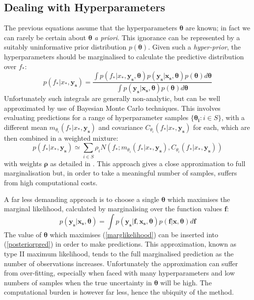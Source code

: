 \documentclass{article}
\DeclareMathOperator*{\argmax}{\arg\!\max\!}
\begin{document}
\subsection{Dealing with Hyperparameters}
The previous equations assume that the hyperparameters $\bm{\theta}$ are known; in fact we can rarely be certain about $\bm{\theta}$ \emph{a priori}. This ignorance can be represented by a suitably uninformative prior distribution $p(\bm{\theta})$. Given such a \emph{hyper-prior}, the hyperparameters should be marginalised to calculate the predictive distribution over $f_*$:
\begin{equation}\label{fullmargint}
p(f_* |x_*, \mathbf{y_s}) = \frac{\int p(f_* | x_*, \mathbf{y_s},\bm{\theta})p(\mathbf{y_s}|\mathbf{x_s},\bm{\theta})p(\bm{\theta})d\bm{\theta}}{\int p(\mathbf{y_s}|\mathbf{x_s},\bm{\theta})p(\bm{\theta})d\bm{\theta}}
\end{equation}
Unfortunately such integrals are generally non-analytic, but can be well approximated by use of Bayesian Monte Carlo \cite{bayesquad} techniques. This involves evaluating predictions for a range of hyperparameter samples $\{\bm{\theta_i}:i \in S\}$, with a different mean $m_{\theta_i}(f_* | x_*, \mathbf{y_s})$ and covariance $C_{\theta_i}(f_* | x_*, \mathbf{y_s})$ for each, which are then combined in a weighted mixture:
\begin{equation}
p(f_* |x_*, \mathbf{y_s}) \simeq \sum_{i \in S} \rho_i N(f_* ; m_{\theta_i}(f_* | x_*, \mathbf{y_s}),C_{\theta_i}(f_* | x_*, \mathbf{y_s}))
\end{equation}
with weights $\bm{\rho}$ as detailed in \cite{osborne2008towards}. This approach gives a close approximation to full marginalisation but, in order to take a meaningful number of samples, suffers from high computational costs.

A far less demanding approach is to choose a single $\bm{\theta}$ which maximises the marginal likelihood, calculated by marginalising over the function values $\mathbf{f}$:
\begin{equation}\label{marglikelihood}
p(\mathbf{y_s} | \mathbf{x_s}, \bm{\theta}) = \int p(\mathbf{y_s} | \mathbf{f},\mathbf{x_s}, \bm{\theta})p(\mathbf{f} | \mathbf{x},\bm{\theta}) d\mathbf{f}
\end{equation}
The value of $\bm{\theta}$ which maximises (\ref{marglikelihood}) can be inserted into (\ref{posteriorpred}) in order to make predictions. This approximation, known as type II maximum likelihood, tends to the full marginalised prediction as the number of observations increases. Unfortunately the approximation can suffer from over-fitting, especially when faced with many hyperparameters and low numbers of samples when the true uncertainty in $\bm\theta$ will be high. The computational burden is however far less, hence the ubiquity of the method.
\end{document}
